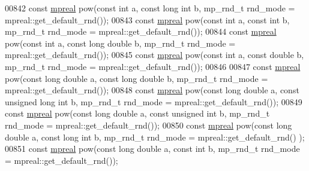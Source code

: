 \begin{DoxyCode}
00842 \textcolor{keyword}{const} \hyperlink{classmpfr_1_1mpreal}{mpreal} pow(\textcolor{keyword}{const} \textcolor{keywordtype}{int} a, \textcolor{keyword}{const} \textcolor{keywordtype}{long} \textcolor{keywordtype}{int} b, mp\_rnd\_t rnd\_mode = mpreal::get\_default\_rnd());
00843 \textcolor{keyword}{const} \hyperlink{classmpfr_1_1mpreal}{mpreal} pow(\textcolor{keyword}{const} \textcolor{keywordtype}{int} a, \textcolor{keyword}{const} \textcolor{keywordtype}{int} b, mp\_rnd\_t rnd\_mode = mpreal::get\_default\_rnd());
00844 \textcolor{keyword}{const} \hyperlink{classmpfr_1_1mpreal}{mpreal} pow(\textcolor{keyword}{const} \textcolor{keywordtype}{int} a, \textcolor{keyword}{const} \textcolor{keywordtype}{long} \textcolor{keywordtype}{double} b, mp\_rnd\_t rnd\_mode = mpreal::get\_default\_rnd());
00845 \textcolor{keyword}{const} \hyperlink{classmpfr_1_1mpreal}{mpreal} pow(\textcolor{keyword}{const} \textcolor{keywordtype}{int} a, \textcolor{keyword}{const} \textcolor{keywordtype}{double} b, mp\_rnd\_t rnd\_mode = mpreal::get\_default\_rnd());
00846 
00847 \textcolor{keyword}{const} \hyperlink{classmpfr_1_1mpreal}{mpreal} pow(\textcolor{keyword}{const} \textcolor{keywordtype}{long} \textcolor{keywordtype}{double} a, \textcolor{keyword}{const} \textcolor{keywordtype}{long} \textcolor{keywordtype}{double} b, mp\_rnd\_t rnd\_mode = 
      mpreal::get\_default\_rnd());
00848 \textcolor{keyword}{const} \hyperlink{classmpfr_1_1mpreal}{mpreal} pow(\textcolor{keyword}{const} \textcolor{keywordtype}{long} \textcolor{keywordtype}{double} a, \textcolor{keyword}{const} \textcolor{keywordtype}{unsigned} \textcolor{keywordtype}{long} \textcolor{keywordtype}{int} b, mp\_rnd\_t rnd\_mode = 
      mpreal::get\_default\_rnd());
00849 \textcolor{keyword}{const} \hyperlink{classmpfr_1_1mpreal}{mpreal} pow(\textcolor{keyword}{const} \textcolor{keywordtype}{long} \textcolor{keywordtype}{double} a, \textcolor{keyword}{const} \textcolor{keywordtype}{unsigned} \textcolor{keywordtype}{int} b, mp\_rnd\_t rnd\_mode = 
      mpreal::get\_default\_rnd());
00850 \textcolor{keyword}{const} \hyperlink{classmpfr_1_1mpreal}{mpreal} pow(\textcolor{keyword}{const} \textcolor{keywordtype}{long} \textcolor{keywordtype}{double} a, \textcolor{keyword}{const} \textcolor{keywordtype}{long} \textcolor{keywordtype}{int} b, mp\_rnd\_t rnd\_mode = mpreal::get\_default\_rnd()
      );
00851 \textcolor{keyword}{const} \hyperlink{classmpfr_1_1mpreal}{mpreal} pow(\textcolor{keyword}{const} \textcolor{keywordtype}{long} \textcolor{keywordtype}{double} a, \textcolor{keyword}{const} \textcolor{keywordtype}{int} b, mp\_rnd\_t rnd\_mode = mpreal::get\_default\_rnd());

\end{DoxyCode}
